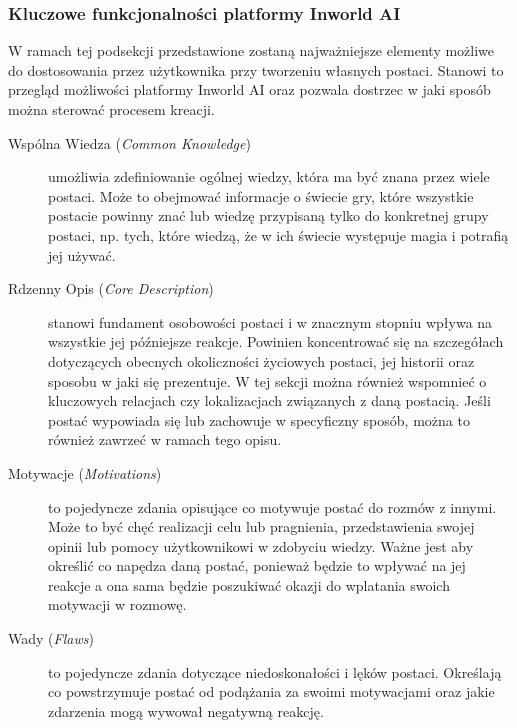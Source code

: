 \subsubsection*{Kluczowe funkcjonalności platformy Inworld AI}

W ramach tej podsekcji przedstawione zostaną najważniejsze elementy możliwe do dostosowania przez
użytkownika przy tworzeniu własnych postaci. Stanowi to przegląd możliwości platformy Inworld AI
oraz pozwala dostrzec w jaki sposób można sterować procesem kreacji.

\begin{description}

    \item[Wspólna Wiedza (\textit{Common Knowledge})] umożliwia zdefiniowanie ogólnej wiedzy, która ma być znana przez wiele
          postaci. Może to obejmować informacje o świecie gry, które wszystkie postacie powinny znać lub wiedzę
          przypisaną tylko do konkretnej grupy postaci, np. tych, które wiedzą, że w ich świecie występuje magia
          i potrafią jej używać\cite{inworld_docs}.

    \item[Rdzenny Opis (\textit{Core Description})] stanowi fundament osobowości postaci i w znacznym stopniu wpływa na
          wszystkie jej późniejsze reakcje. Powinien koncentrować się na szczegółach dotyczących obecnych
          okoliczności życiowych postaci, jej historii oraz sposobu w jaki się prezentuje. W tej sekcji
          można również wspomnieć o kluczowych relacjach czy lokalizacjach
          związanych z daną postacią. Jeśli postać wypowiada się lub zachowuje w specyficzny sposób,
          można to również zawrzeć w ramach tego opisu\cite{inworld_docs}.

    \item[Motywacje (\textit{Motivations})] to pojedyncze zdania opisujące co motywuje postać do
          rozmów z innymi. Może to być chęć realizacji celu lub pragnienia, przedstawienia swojej opinii lub
          pomocy użytkownikowi w zdobyciu wiedzy. Ważne jest aby określić co napędza daną postać, ponieważ
          będzie to wpływać na jej reakcje a ona sama będzie poszukiwać okazji do wplatania swoich motywacji w rozmowę\cite{inworld_docs}.

    \item[Wady (\textit{Flaws})] to pojedyncze zdania dotyczące niedoskonałości i lęków postaci. Określają
          co powstrzymuje postać od podążania za swoimi motywacjami oraz jakie zdarzenia mogą wywował negatywną
          reakcję\cite{inworld_docs}.


\end{description}
